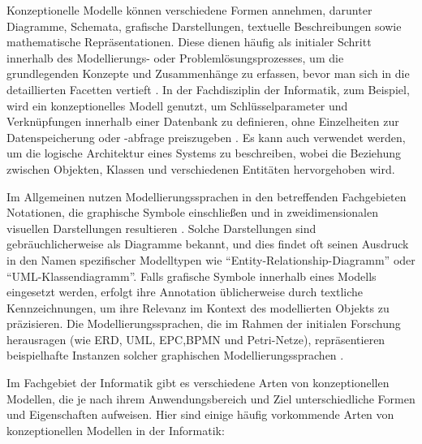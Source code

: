 Konzeptionelle Modelle können verschiedene Formen annehmen, darunter Diagramme, Schemata, grafische Darstellungen, textuelle Beschreibungen sowie mathematische Repräsentationen. Diese dienen häufig als initialer Schritt innerhalb des Modellierungs- oder Problemlösungsprozesses, um die grundlegenden Konzepte und Zusammenhänge zu erfassen, bevor man sich in die detaillierten Facetten vertieft \cite{abramowicz2013business}. In der Fachdisziplin der Informatik, zum Beispiel, wird ein konzeptionelles Modell genutzt, um Schlüsselparameter und Verknüpfungen innerhalb einer Datenbank zu definieren, ohne Einzelheiten zur Datenspeicherung oder -abfrage preiszugeben \cite{abramowicz2013business}. Es kann auch verwendet werden, um die logische Architektur eines Systems zu beschreiben, wobei die Beziehung zwischen Objekten, Klassen und verschiedenen Entitäten hervorgehoben wird.

Im Allgemeinen nutzen Modellierungssprachen in den betreffenden Fachgebieten Notationen, die graphische Symbole einschließen und in zweidimensionalen visuellen Darstellungen resultieren \cite{moody2009physics}. Solche Darstellungen sind gebräuchlicherweise als Diagramme bekannt, und dies findet oft seinen Ausdruck in den Namen spezifischer Modelltypen wie ``Entity-Relationship-Diagramm'' oder ``\ac{UML}-Klassendiagramm''. Falls grafische Symbole innerhalb eines Modells eingesetzt werden, erfolgt ihre Annotation üblicherweise durch textliche Kennzeichnungen, um ihre Relevanz im Kontext des modellierten Objekts zu präzisieren. Die Modellierungssprachen, die im Rahmen der initialen Forschung herausragen (wie \ac{ERD}, UML, EPC,\ac{BPMN} und Petri-Netze), repräsentieren beispielhafte Instanzen solcher graphischen Modellierungssprachen \cite{ullrich2021automated}.

Im Fachgebiet der Informatik gibt es verschiedene Arten von konzeptionellen Modellen, die je nach ihrem Anwendungsbereich und Ziel unterschiedliche Formen und Eigenschaften aufweisen. Hier sind einige häufig vorkommende Arten von konzeptionellen Modellen in der Informatik:

